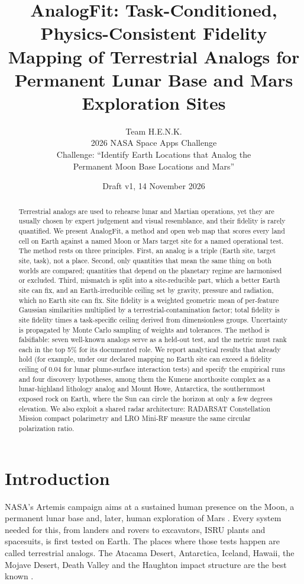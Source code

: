 \documentclass[11pt,a4paper]{article}
\title{AnalogFit: Task-Conditioned, Physics-Consistent Fidelity Mapping of Terrestrial Analogs for Permanent Lunar Base and Mars Exploration Sites}
\author{Team H.E.N.K.\\[2pt] \small 2026 NASA Space Apps Challenge\\ \small Challenge: ``Identify Earth Locations that Analog the\\ \small Permanent Moon Base Locations and Mars''}
\date{Draft v1, 14 November 2026}
\begin{document}
\maketitle

\begin{abstract}
Terrestrial analogs are used to rehearse lunar and Martian operations, yet they are usually chosen by expert judgement and visual resemblance, and their fidelity is rarely quantified. We present AnalogFit, a method and open web map that scores every land cell on Earth against a named Moon or Mars target site for a named operational test. The method rests on three principles. First, an analog is a triple (Earth site, target site, task), not a place. Second, only quantities that mean the same thing on both worlds are compared; quantities that depend on the planetary regime are harmonised or excluded. Third, mismatch is split into a site-reducible part, which a better Earth site can fix, and an Earth-irreducible ceiling set by gravity, pressure and radiation, which no Earth site can fix. Site fidelity is a weighted geometric mean of per-feature Gaussian similarities multiplied by a terrestrial-contamination factor; total fidelity is site fidelity times a task-specific ceiling derived from dimensionless groups. Uncertainty is propagated by Monte Carlo sampling of weights and tolerances. The method is falsifiable: seven well-known analogs serve as a held-out test, and the metric must rank each in the top 5\% for its documented role. We report analytical results that already hold (for example, under our declared mapping no Earth site can exceed a fidelity ceiling of 0.04 for lunar plume-surface interaction tests) and specify the empirical runs and four discovery hypotheses, among them the Kunene anorthosite complex as a lunar-highland lithology analog and Mount Howe, Antarctica, the southernmost exposed rock on Earth, where the Sun can circle the horizon at only a few degrees elevation. We also exploit a shared radar architecture: RADARSAT Constellation Mission compact polarimetry and LRO Mini-RF measure the same circular polarization ratio.
\end{abstract}

\section{Introduction}

NASA's Artemis campaign aims at a sustained human presence on the Moon, a permanent lunar base and, later, human exploration of Mars \citep{spaceapps2026}. Every system needed for this, from landers and rovers to excavators, ISRU plants and spacesuits, is first tested on Earth. The places where those tests happen are called terrestrial analogs. The Atacama Desert, Antarctica, Iceland, Hawaii, the Mojave Desert, Death Valley and the Haughton impact structure are the best known \citep{spaceapps2026,navarro2003,preston2014}.
\end{document}
